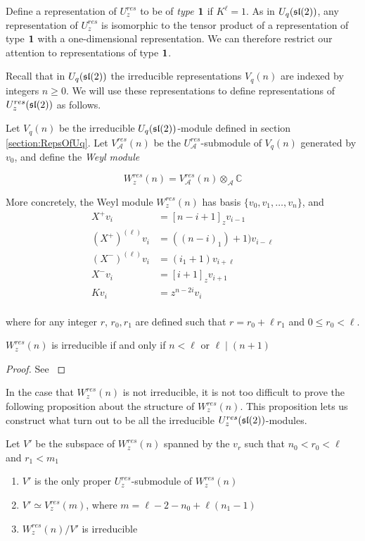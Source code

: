 Define a representation of $U_z^{res}$ to be of \emph{type $\mathbf{1}$} if
$K^\ell = 1$. As in $U_q(\mathfrak{sl}(2))$, any representation of $U_z^{res}$ is
isomorphic to the tensor product of a representation of type $\mathbf{1}$ with
a one-dimensional representation. We can therefore restrict our attention to
representations of type $\mathbf{1}$. 

Recall that in $U_q(\mathfrak{sl}(2))$ the irreducible representations $V_q(n)$ are
indexed by integers $n \geq 0$. We will use these representations to define
representations of $U_z^{res}(\mathfrak{sl}(2))$ as follows.

Let $V_q(n)$ be the irreducible $U_q(\mathfrak{sl}(2))$-module defined in section
\ref{section:RepsOfUq}.  Let $V_\mathcal{A}^{res}(n)$ be the
$U_\mathcal{A}^{res}$-submodule of $V_q(n)$ generated by $v_0$, and define the
\emph{Weyl module}

\begin{equation}
    W_z^{res}(n) = V_\mathcal{A}^{res}(n) \otimes_\mathcal{A} \mathbb{C}
\end{equation}


More concretely, the Weyl module $W_z^{res}(n)$ has basis $\{v_0, v_1, \ldots, v_n\}$, and
\begin{align}
    X^+ v_i &= [n-i+1]_z v_{i-1} \\
    (X^+)^{(\ell)} v_i &= ((n-i)_1) + 1) v_{i-\ell} \\
    (X^-)^{(\ell)} v_i &= (i_1 + 1) v_{i+\ell} \\
    X^-v_i &= [i+1]_z v_{i+1} \\
    Kv_i &= z^{n-2i} v_i \\
\end{align}

where for any integer $r$, $r_0,r_1$ are defined such that $r = r_0 + \ell r_1$
and $0 \leq r_0 < \ell$. 

\begin{claim} $W_z^{res}(n)$ is irreducible if and only if $n < \ell$ or $\ell \mid (n+1)$
\end{claim}
\begin{proof}
See \cite{CP}
\end{proof}

In the case that $W_z^{res}(n)$ is not irreducible, it is not too difficult to
prove the following proposition about the structure of $W_z^{res}(n)$. This
proposition lets us construct what turn out to be all the irreducible
$U_z^{res}(\mathfrak{sl}(2))$-modules.

\begin{prop}
Let $V'$ be the subspace of $W_z^{res}(n)$ spanned by the $v_r$ such that $n_0 < r_0 < \ell$ and $r_1 < m_1$
\begin{enumerate}
    \renewcommand{\labelenumi}{\roman{enumi})}
    \item $V'$ is the only proper $U_z^{res}$-submodule of $W_z^{res}(n)$
    \item $V' \simeq V_z^{res}(m)$, where $m = \ell - 2 - n_0 + \ell(n_1 - 1)$
    \item $W_z^{res}(n) / V'$ is irreducible
\end{enumerate}
\end{prop}

